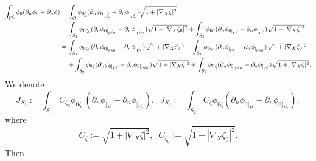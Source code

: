 \documentclass[11pt]{article}
\begin{document}
\begin{equation}\label{term2startcomp}
	\begin{split}
		\displaystyle\int_{\Gamma^{\underline{\zeta}}} \phi_0(\partial_n\phi_0-\partial_n\phi)&=\displaystyle\int_{\mathcal O }\phi_{0\underline{\zeta}}(\partial_n\phi_{0|_{\Gamma^{\underline{\zeta}}}}-\partial_n\phi_{|_{\Gamma^{\underline{\zeta}}}})\sqrt{1+|\nabla_X\underline{\zeta}|^2}\\
		&=\displaystyle\int_{S_1}\phi_{0\zeta_0}(\partial_n\phi_{0|_{\Gamma^{\zeta_0}}}-\partial_n\phi_{|_{\Gamma^{\zeta_0}}})\sqrt{1+|\nabla_X\zeta_0|^2}+\displaystyle\int_{S_2}\phi_{0\zeta}(\partial_n\phi_{0|_{\Gamma^{\zeta}}}-\partial_n\phi_{|_{\Gamma^{\zeta}}})\sqrt{1+|\nabla_X\zeta|^2}\\
		&=\displaystyle\int_{S_1}\phi_{0\zeta_0}(\partial_n\phi_{0|_{\Gamma^{\zeta_0}}}-\partial_n\phi_{|_{\Gamma^{\zeta}}})\sqrt{1+|\nabla_X\zeta_0|^2}+\displaystyle\int_{S_1}\phi_{0\zeta_0}(\partial_n\phi_{|_{\Gamma^{\zeta}}}-\partial_n\phi_{|_{\Gamma^{\zeta_0}}})\sqrt{1+|\nabla_X\zeta_0|^2}\\
		&\hspace{0.4cm}+\displaystyle\int_{S_2}\phi_{0\zeta}(\partial_n\phi_{0|_{\Gamma^{\zeta}}}-\partial_n\phi_{0|_{\Gamma^{\zeta_0}}})\sqrt{1+|\nabla_X\zeta|^2}+\displaystyle\int_{S_2}\phi_{0\zeta}(\partial_n\phi_{0|_{\Gamma^{\zeta_0}}}-\partial_n\phi_{|_{\Gamma^{\zeta}}})\sqrt{1+|\nabla_X\zeta|^2}.
	\end{split}
\end{equation}
We denote 
$$J_{S_1}:=\displaystyle\int_{S_1}C_{\zeta_0}\phi_{0\zeta_0}(\partial_n\phi_{|_{\Gamma^{\zeta}}}-\partial_n\phi_{|_{\Gamma^{\zeta_0}}}),\;\;J_{S_2}:=\displaystyle\int_{S_2}C_{\zeta}\phi_{0\zeta}(\partial_n\phi_{0|_{\Gamma^{\zeta}}}-\partial_n\phi_{0|_{\Gamma^{\zeta_0}}}),$$
where
$$C_{\zeta} :=\sqrt{1+|\nabla_X\zeta|^2},\;\; C_{\zeta_0}:=\sqrt{1+|\nabla_X\zeta_0|^2}.$$
Then
\end{document}
